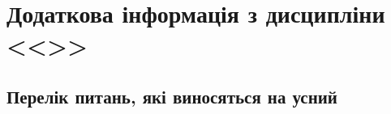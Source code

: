 \documentclass{Syllabus}
\begin{document}
\section{Додаткова інформація з дисципліни <<\discipline>>}



%
%


\subsection*{Перелік питань, які виносяться на усний \control}


\vfill
\thispagestyle{empty}
\printrequisites
\end{document}
